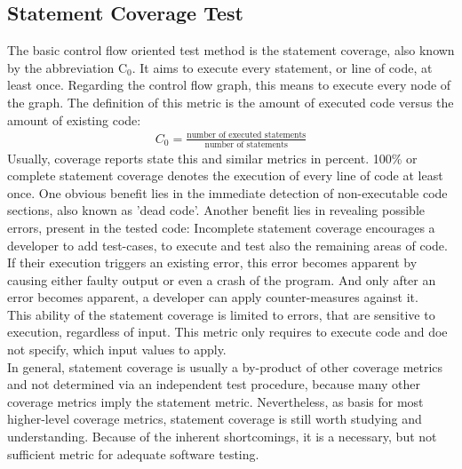 	\subsection{Statement Coverage Test}
	The basic control flow oriented test method is the statement coverage, also known by the abbreviation C$_0$. It aims to execute every statement, or line of code, at least once. Regarding the control flow graph, this means to execute every node of the graph. The definition of this metric is the amount of executed code versus the amount of existing code:
		\begin{align*}
		C_0 = \frac{\textrm{number of executed statements}}{\textrm{number of statements}}
		\end{align*}
	Usually, coverage reports state this and similar metrics in percent. 100\% or complete statement coverage denotes the execution of every line of code at least once. One obvious benefit lies in the immediate detection of non-executable code sections, also known as 'dead code'. Another benefit lies in revealing possible errors, present in the tested code: Incomplete statement coverage encourages a developer to add test-cases, to execute and test also the remaining areas of code. If their execution triggers an existing error, this error becomes apparent by causing either faulty output or even a crash of the program. And only after an error becomes apparent, a developer can apply counter-measures against it. \\
	This ability of the statement coverage is limited to errors, that are sensitive to execution, regardless of input. This metric only requires to execute code and doe not specify, which input values to apply.  \\
	In general, statement coverage is usually a by-product of other coverage metrics and not determined via an independent test procedure, because many other coverage metrics imply the statement metric. Nevertheless, as basis for most higher-level coverage metrics, statement coverage is still worth studying and understanding. Because of the inherent shortcomings, it is a necessary, but not sufficient metric for adequate software testing. \\
